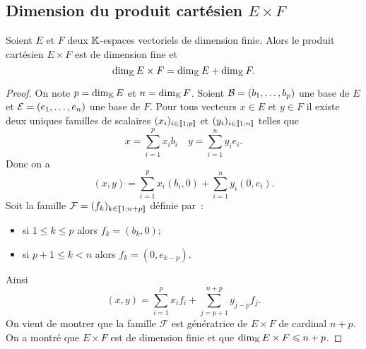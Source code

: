 \subsection{Dimension du produit cartésien \(E \times F\)}

\begin{theo}
  Soient \(E\) et \(F\) deux \(\mathbb{K}\)-espaces vectoriels de dimension finie. Alors le produit cartésien \(E \times F\) est de dimension fine et
  \begin{equation}
    \operatorname{dim}_{\mathbb{K}} E \times F = \operatorname{dim}_{\mathbb{K}} E + \operatorname{dim}_{\mathbb{K}} F.
  \end{equation}
\end{theo}
\begin{proof}
On note \(p=\operatorname{dim}_{\mathbb{K}} E\) et \(n=\operatorname{dim}_{\mathbb{K}} F\). Soient \(\mathcal{B}=(b_1,\ldots, b_p)\) une base de \(E\) et \(\mathcal{E}=(e_1, \ldots, e_n)\) une base de \(F\). Pour tous vecteurs \(x \in E\) et \(y \in F\) il existe deux uniques familles de scalaires \((x_i)_{i \in \mathopen{\llbracket}1\mathclose{}\mathpunct{};p\mathclose{\rrbracket}}\) et \((y_i)_{i \in \mathopen{\llbracket}1\mathclose{}\mathpunct{};n\mathclose{\rrbracket}}\) telles que
    \begin{equation}
      x = \sum_{i=1}^p x_i b_i \quad y = \sum_{i=1}^n y_i e_i.
    \end{equation}
    Donc on a
    \begin{equation}
      (x,y) = \sum_{i=1}^p x_i (b_i,0) + \sum_{i=1}^n y_i (0,e_i).
    \end{equation}
Soit la famille \(\mathcal{F}=(f_k)_{k \in \mathopen{\llbracket}1\mathclose{}\mathpunct{};n+p\mathclose{\rrbracket}}\) définie par~:
\begin{itemize}
\item si \(1 \leqslant k \leqslant p\) alors \(f_k=(b_k,0)\);
\item si \(p+1 \leqslant k < n\) alors \(f_k=(0,e_{k-p})\).
\end{itemize}
Ainsi
\begin{equation}
  (x,y)=\sum_{i=1}^p x_i f_i + \sum_{j=p+1}^{n+p} y_{j-p} f_j.
\end{equation}
On vient de montrer que la famille \(\mathcal{F}\) est génératrice de \(E \times F\) de cardinal \(n+p\). On a montré que \(E \times F\) est de dimension finie et que \(\operatorname{dim}_{\mathbb{K}} E\times F \leqslant n+p\). 


\end{proof}

